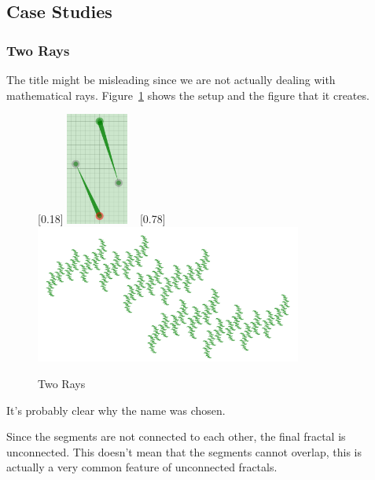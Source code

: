     \subsection{Case Studies}
        
        \subsubsection{Two Rays}

            The title might be misleading since we are not actually dealing with mathematical rays.
            Figure~\ref{ray_01} shows the setup and the figure that it creates.

            \begin{figure}[H]
                \centering
                \caption{\label{ray_01} Two Rays}
                [0.18\textwidth]
                    {\includegraphics[width=0.18\textwidth]{img/Simple_Techniques/Cases/rays/ray_set_01.png}}
                ~
                [0.78\textwidth]
                    {\includegraphics[width=0.78\textwidth]{img/Simple_Techniques/Cases/rays/ray_01.png}}
            \end{figure}

            It's probably clear why the name  was chosen.

            Since the segments are not connected to each other, the final fractal is unconnected.
            This doesn't mean that the segments cannot overlap, this is actually a very common feature of unconnected fractals.

